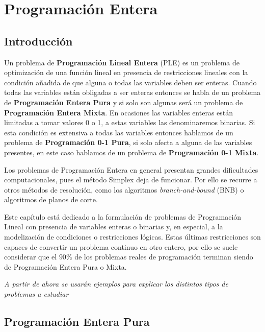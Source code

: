 \section{Programación Entera}

\subsection{Introducción}

Un problema de \textbf{Programación Lineal Entera} (PLE) es un problema de optimización de una función lineal en presencia
de restricciones lineales con la condición añadida de que alguna o todas las variables deben ser enteras. Cuando todas las
variables están obligadas a ser enteras entonces se habla de un problema de \textbf{Programación Entera Pura} y si solo son
algunas será un problema de \textbf{Programación Entera Mixta}. En ocasiones las variables enteras están limitadas a tomar
valores 0 o 1, a estas variables las denominaremos binarias. Si esta condición es extensiva a todas las variables entonces
hablamos de un problema de \textbf{Programación 0-1 Pura}, si solo afecta a alguna de las variables presentes, en este caso
hablamos de un problema de \textbf{Programación 0-1 Mixta}.

\vspace*{2mm}

Los problemas de Programación Entera en general presentan grandes dificultades computacionales, pues el método Simplex deja
de funcionar. Por ello se recurre a otros métodos de resolución, como los algoritmos \textit{branch-and-bound} (BNB) o 
algoritmos de planos de corte.

\vspace*{2mm}

Este capítulo está dedicado a la formulación de problemas de Programación Lineal con presencia de variables enteras o 
binarias y, en especial, a la modelización de condiciones o restricciones lógicas. Estas últimas restricciones son capaces
de convertir un problema continuo en otro entero, por ello se suele considerar que el $90\%$ de los problemas reales de 
programación terminan siendo de Programación Entera Pura o Mixta.


\begin{flushright}
    \textit{A partir de ahora se usarán ejemplos para explicar los distintos tipos de problemas a estudiar}
\end{flushright}

\subsection{Programación Entera Pura}


